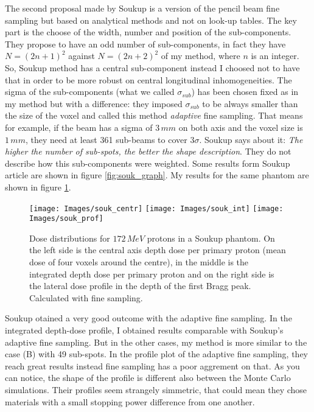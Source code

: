 \documentclass[12pt, a4paper, twoside]{book}
\begin{document}
The second proposal made by Soukup is a version of the pencil beam fine sampling but based on analytical methods and not on look-up tables. The key part is the choose of the width, number and position of the sub-components. They propose to have an odd number of sub-components, in fact they have $N=(2n+1)^2$ against $N=(2n+2)^2$ of my method, where $n$ is an integer. So, Soukup method has a central sub-component instead I choosed not to have that in order to be more robust on central longitudinal inhomogeneities. The sigma of the sub-components (what we called $\sigma_{sub}$) has been chosen fixed as in my method but with a difference: they imposed $\sigma_{sub}$ to be always smaller than the size of the voxel and called this method \emph{adaptive} fine sampling. That means for example, if the beam has a sigma of $3\,mm$ on both axis and the voxel size is $1\,mm$, they need at least 361 sub-beams to cover $3\sigma$. Soukup says about it: \emph{The higher the number of sub-spots, the better the
shape description}. They do not describe how this sub-components were weighted.
Some results form Soukup article are shown in figure \ref{fig:souk_graph}. My results for the same phantom are shown in figure \ref{fig:souk_fs}.
\begin{figure}[!t]
\centering
{\texttt{[image: Images/souk\_centr]}} 
{\texttt{[image: Images/souk\_int]}} 
{\texttt{[image: Images/souk\_prof]}} 
\caption{Dose distributions for $172\,MeV$ protons in a Soukup phantom. On the left
side is the central axis depth dose per primary proton (mean dose of four voxels around the centre), in the middle is the integrated depth dose per primary proton and on the right side is the lateral dose profile in the depth of the first Bragg peak. Calculated with fine sampling.}
\label{fig:souk_fs}
\end{figure}
Soukup otained a very good outcome with the adaptive fine sampling. In the integrated depth-dose profile, I obtained results comparable with Soukup's adaptive fine sampling. But in the other cases, my method is more similar to the case (B) with 49 sub-spots. In the profile plot of the adaptive fine sampling, they reach great results instead fine sampling has a poor aggrement on that. As you can notice, the shape of the profile is different also between the Monte Carlo simulations. Their profiles seem strangely simmetric, that could mean they chose materials with a small stopping power difference from one another. 
\end{document}
